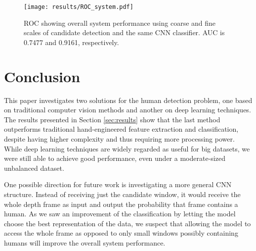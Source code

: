     \begin{figure}
    \centering
    \texttt{[image: results/ROC\_system.pdf]}
    \caption{ROC showing overall system performance using coarse and fine scales of candidate detection and the same CNN classifier. AUC is 0.7477 and 0.9161, respectively.}
    \label{fig:result-system}
    \end{figure}



\section{Conclusion}
\label{sec:conclusion}
    This paper investigates two solutions for the human detection problem, one based on traditional computer vision methods and another on deep learning techniques. The results presented in Section \ref{sec:results} show that the last method outperforms traditional hand-engineered feature extraction and classification, despite having higher complexity and thus requiring more processing power. While deep learning techniques are widely regarded as useful for big datasets, we were still able to achieve good performance, even under a moderate-sized unbalanced dataset.

    One possible direction for future work is investigating a more general CNN structure. Instead of receiving just the candidate window, it would receive the whole depth frame as input and output the probability that frame contains a human. As we saw an improvement of the classification by letting the model choose the best representation of the data, we suspect that allowing the model to access the whole frame as opposed to only small windows possibly containing humans will improve the overall system performance.

